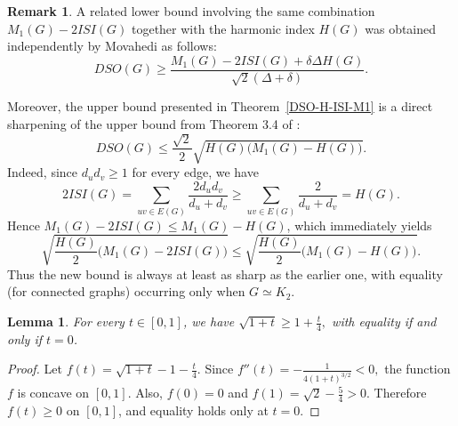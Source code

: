 \documentclass{article}
\newtheorem{lemma}{Lemma}
\theoremstyle{definition}
\newtheorem{remark}{Remark}
\begin{document}
\begin{remark}
A related lower bound involving the same combination $M_1(G)-2ISI(G)$ together with the harmonic index $H(G)$ was obtained independently by Movahedi \cite{5} as follows:
\[
DSO(G)\ge \frac{M_1(G)-2ISI(G)+\delta\Delta H(G)}{\sqrt{2}(\Delta+\delta)}.
\]

Moreover, the upper bound presented in Theorem~\ref{DSO-H-ISI-M1} is a direct sharpening of the upper bound from Theorem 3.4 of \cite{5}:
\[
DSO(G)\le \frac{\sqrt{2}}{2}\sqrt{H(G)\bigl(M_1(G)-H(G)\bigr)}.
\]
Indeed, since $d_ud_v \ge 1$ for every edge, we have
\[
2ISI(G)=\sum_{uv\in E(G)}\frac{2d_ud_v}{d_u+d_v}
\ge \sum_{uv\in E(G)}\frac{2}{d_u+d_v}=H(G).
\]
Hence $M_1(G)-2ISI(G) \le M_1(G)-H(G)$, which immediately yields
\[
\sqrt{\frac{H(G)}{2}\bigl(M_1(G)-2ISI(G)\bigr)}
\le
\sqrt{\frac{H(G)}{2}\bigl(M_1(G)-H(G)\bigr)}.
\]
Thus the new bound is always at least as sharp as the earlier one, with equality (for connected graphs) occurring only when $G\simeq K_2$.
\end{remark}
\begin{lemma}\label{newl}
For every $t\in[0,1]$, we have
$
\sqrt{1+t}\ge1+\frac{t}{4},
$
with equality if and only if $t=0$.
\end{lemma}

\begin{proof}
Let
$
f(t)=\sqrt{1+t}-1-\frac{t}{4}.
$
Since
$
f''(t)= -\frac1{4(1+t)^{3/2}}<0,
$
the function $f$ is concave on $[0,1]$. Also,
$
f(0)=0$ and $f(1)=\sqrt2-\frac54>0$.
Therefore $f(t)\ge0$ on $[0,1]$, and equality holds only at $t=0$.
\end{proof}
\end{document}
